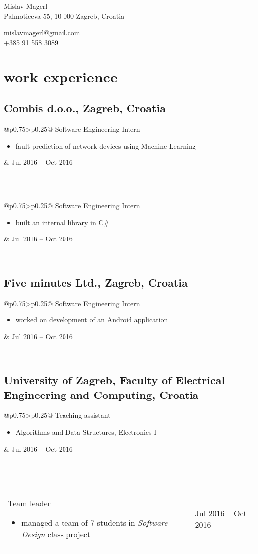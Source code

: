 \documentclass[a4paper]{article}
\makeatletter
\newlength{\tablewidth}
\newenvironment{period}[2]{%
\newcommand{\sarma}{#2}%
\setlength{\tablewidth}{\linewidth}
\addtolength{\tablewidth}{-2\tabcolsep}
\begin{tabular}{@{}p{0.75\tablewidth}>{\raggedleft\arraybackslash}p{0.25\tablewidth}@{}}%
#1 \newline
\begin{itemize}
}{%
\end{itemize} & \sarma \\%
\end{tabular}\\
}
\makeatother
\begin{document}
\fontfamily{\sfdefault}
\selectfont

\begin{minipage}{.5\textwidth}
\LARGE{Mislav Magerl}\\
\normalsize{Palmoticeva 55, 10 000 Zagreb, Croatia}
\end{minipage}%
\begin{minipage}{.5\textwidth}
\raggedleft
\href{mailto:mislavmagerl@gmail.com}{mislavmagerl@gmail.com} \\
+385 91 558 3089
\end{minipage}

\vspace{1em}

\section{work experience}
\subsection{Combis d.o.o., Zagreb, Croatia}
\begin{period}{Software Engineering Intern}{Jul 2016 -- Oct 2016}
    \item 
        fault prediction of network devices using Machine Learning
\end{period}
\vspace{-1em}\\
\begin{period}{Software Engineering Intern}{Jan 2016 -- Feb 2016}
    \item 
        built an internal library in C\#
\end{period}
\subsection{Five minutes Ltd., Zagreb, Croatia}
\begin{period}{Software Engineering Intern}{Jul 2015 -- Aug 2015}
    \item 
        worked on development of an Android application
\end{period}

\subsection{University of Zagreb, Faculty of Electrical Engineering and Computing, Croatia}
\begin{period}{Teaching assistant}{Mar 2013 -- Jan 2014}
    \item Algorithms and Data Structures, Electronics I
\end{period}
\vspace{-1em}\\
\begin{period}{Team leader}{Sep 2014 -- Jan 2015}
    \item managed a team of 7 students in \textit{Software Design} class project
\end{period}
\end{document}
